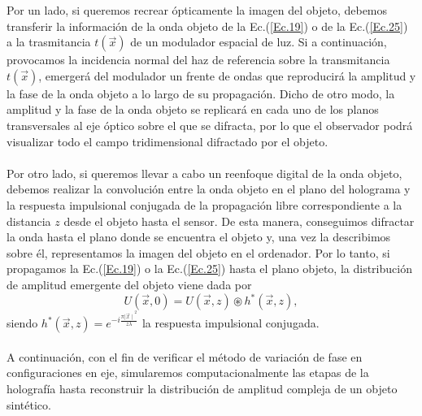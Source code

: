 \documentclass[12pt]{article}
\begin{document}
Por un lado, si queremos  recrear ópticamente la imagen del objeto, debemos transferir la información de la onda objeto de la Ec.(\ref{Ec.19}) o de la Ec.(\ref{Ec.25}) a la trasmitancia  $t(\Vec{x})$ de un modulador espacial de luz. Si a continuación, provocamos la incidencia normal del  haz de referencia sobre la transmitancia $t(\Vec{x})$, emergerá del modulador un frente de ondas que reproducirá la amplitud y la fase de la onda objeto a lo largo de su propagación. Dicho de otro modo, la amplitud y la fase de la onda objeto se replicará en cada uno de los planos transversales al eje óptico sobre el que se difracta, por lo que el observador podrá visualizar todo el campo tridimensional difractado por el objeto. \\ \\
Por otro lado, si queremos llevar a cabo un reenfoque digital de la onda objeto, debemos realizar la convolución entre la onda objeto en el plano del holograma y la respuesta impulsional conjugada de la propagación libre correspondiente a la distancia $z$ desde el objeto hasta el sensor. De esta manera, conseguimos difractar la onda hasta el plano donde se encuentra el objeto y, una vez la describimos  sobre él, representamos la imagen del objeto en el ordenador.  Por lo tanto, si propagamos la Ec.(\ref{Ec.19}) o  la Ec.(\ref{Ec.25}) hasta el plano objeto,  la distribución de amplitud emergente del objeto viene dada por
\begin{equation}
   U (\vec{x}, 0) = U (\vec{x}, z) \circledast h^{*} (\Vec{x}, z),
    \label{Ec.26}
\end{equation}
siendo   $h^{*} (\Vec{x}, z) =  e^{- i \frac{\pi {\mid \vec{x} \mid}^{2}}{z \lambda}}$ la respuesta impulsional conjugada.\\ \\
A continuación, con el fin de verificar el método de variación de fase en configuraciones en eje, simularemos computacionalmente las etapas de la holografía hasta reconstruir la distribución de amplitud compleja de un objeto sintético.
\end{document}
